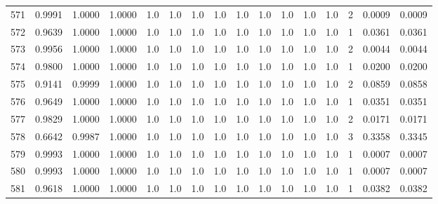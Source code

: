 \begin{tabular}{lrrrrrrrrrrrrrrr}
571 &      0.9991 &  1.0000 &  1.0000 &     1.0 &     1.0 &     1.0 &     1.0 &     1.0 &     1.0 &     1.0 &      1.0 &        1.0 &      2 &                    0.0009 &                     0.0009 \\
572 &      0.9639 &  1.0000 &  1.0000 &     1.0 &     1.0 &     1.0 &     1.0 &     1.0 &     1.0 &     1.0 &      1.0 &        1.0 &      1 &                    0.0361 &                     0.0361 \\
573 &      0.9956 &  1.0000 &  1.0000 &     1.0 &     1.0 &     1.0 &     1.0 &     1.0 &     1.0 &     1.0 &      1.0 &        1.0 &      2 &                    0.0044 &                     0.0044 \\
574 &      0.9800 &  1.0000 &  1.0000 &     1.0 &     1.0 &     1.0 &     1.0 &     1.0 &     1.0 &     1.0 &      1.0 &        1.0 &      1 &                    0.0200 &                     0.0200 \\
575 &      0.9141 &  0.9999 &  1.0000 &     1.0 &     1.0 &     1.0 &     1.0 &     1.0 &     1.0 &     1.0 &      1.0 &        1.0 &      2 &                    0.0859 &                     0.0858 \\
576 &      0.9649 &  1.0000 &  1.0000 &     1.0 &     1.0 &     1.0 &     1.0 &     1.0 &     1.0 &     1.0 &      1.0 &        1.0 &      1 &                    0.0351 &                     0.0351 \\
577 &      0.9829 &  1.0000 &  1.0000 &     1.0 &     1.0 &     1.0 &     1.0 &     1.0 &     1.0 &     1.0 &      1.0 &        1.0 &      2 &                    0.0171 &                     0.0171 \\
578 &      0.6642 &  0.9987 &  1.0000 &     1.0 &     1.0 &     1.0 &     1.0 &     1.0 &     1.0 &     1.0 &      1.0 &        1.0 &      3 &                    0.3358 &                     0.3345 \\
579 &      0.9993 &  1.0000 &  1.0000 &     1.0 &     1.0 &     1.0 &     1.0 &     1.0 &     1.0 &     1.0 &      1.0 &        1.0 &      1 &                    0.0007 &                     0.0007 \\
580 &      0.9993 &  1.0000 &  1.0000 &     1.0 &     1.0 &     1.0 &     1.0 &     1.0 &     1.0 &     1.0 &      1.0 &        1.0 &      1 &                    0.0007 &                     0.0007 \\
581 &      0.9618 &  1.0000 &  1.0000 &     1.0 &     1.0 &     1.0 &     1.0 &     1.0 &     1.0 &     1.0 &      1.0 &        1.0 &      1 &                    0.0382 &                     0.0382 \\

\end{tabular}
